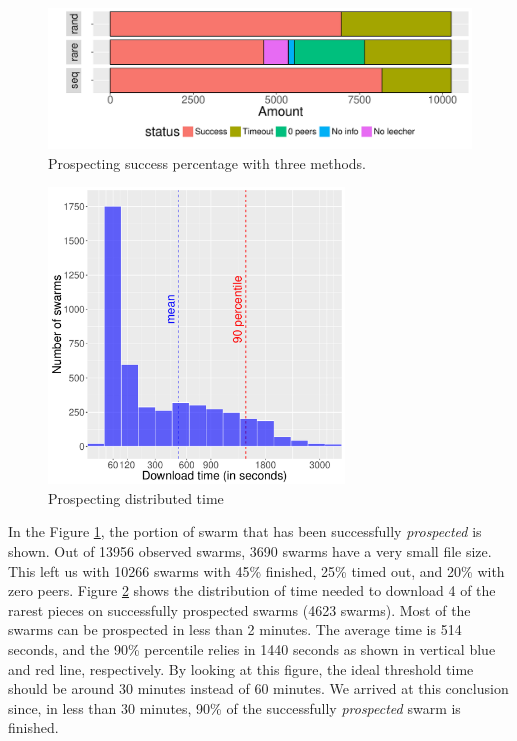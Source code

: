 \begin{figure}[h]
	\centering
	\includegraphics[width=\textwidth]{pics/results/dpredown_merge.pdf}
	\caption{Prospecting success percentage with three methods.}
	\label{fig:predownprecent}
\end{figure}

\begin{figure}[h]
	\centering
	\includegraphics[width=0.7\textwidth]{pics/results/hpredown.pdf}
	\caption{Prospecting distributed time}
	\label{fig:predownhist}
\end{figure}

In the Figure \ref{fig:predownprecent}, the portion of swarm that has been successfully \textit{prospected} is shown. Out of 13956 observed swarms, 3690 swarms have a very small file size. This left us with 10266 swarms with 45\% finished, 25\% timed out, and 20\% with zero peers. Figure \ref{fig:predownhist} shows the distribution of time needed to download 4 of the rarest pieces on successfully prospected swarms (4623 swarms). Most of the swarms can be prospected in less than 2 minutes. The average time is 514 seconds, and the 90\% percentile relies in 1440 seconds as shown in vertical blue and red line, respectively. By looking at this figure, the ideal threshold time should be around 30 minutes instead of 60 minutes. We arrived at this conclusion since, in less than 30 minutes, 90\% of the successfully \textit{prospected} swarm is finished.

